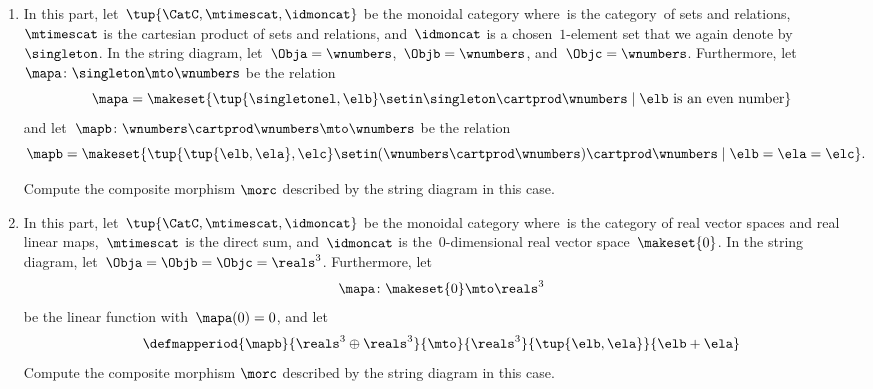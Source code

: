 \begin{gradedexercise}
\begin{enumerate}
        \item In this part, let~$\tup{\CatC,\mtimescat,\idmoncat}$ be the monoidal category where~\CatC is the category~\Rel of sets and relations,~$\mtimescat$ is the cartesian product of sets and relations, and~$\idmoncat$ is a chosen~$1$-element set that we again denote by~$\singleton$.
              In the string diagram, let~$\Obja = \wnumbers$,~$\Objb = \wnumbers$, and~$\Objc = \wnumbers$.
              Furthermore, let~$\mapa\colon \singleton \mto \wnumbers$ be the relation
              \begin{equation}
                  \mapa = \makeset{ \tup{\singletonel, \elb} \setin \singleton \cartprod \wnumbers \mid \elb \text{ is an even number}}
              \end{equation}
              and let~$\mapb \colon \wnumbers \cartprod \wnumbers \mto \wnumbers$ be the relation
              \begin{equation}
                  \mapb = \makeset{ \tup{\tup{\elb, \ela}, \elc} \setin (\wnumbers \cartprod \wnumbers) \cartprod \wnumbers \mid \elb = \ela = \elc}.
              \end{equation}

              Compute the composite morphism $\morc$ described by the string diagram in this case.

        \item In this part, let~$\tup{\CatC,\mtimescat,\idmoncat}$ be the monoidal category where~\CatC is the category of real vector spaces and real linear maps,~$\mtimescat$ is the direct sum, and~$\idmoncat$ is the~$0$-dimensional real vector space~$\makeset{0}$.
              In the string diagram, let~$\Obja = \Objb = \Objc = \reals^3$.
              Furthermore, let
              \begin{equation}
                  \mapa\colon \makeset{0} \mto \reals^3
              \end{equation}
              be the linear function with~$\mapa(0) = 0$, and let
              \begin{equation}
                  \defmapperiod{\mapb}{\reals^3\oplus \reals^3}{\mto}{\reals^3}{\tup{\elb,\ela}}{\elb+\ela}
              \end{equation}
              Compute the composite morphism $\morc$ described by the string diagram in this case.
    \end{enumerate}
\end{gradedexercise}
